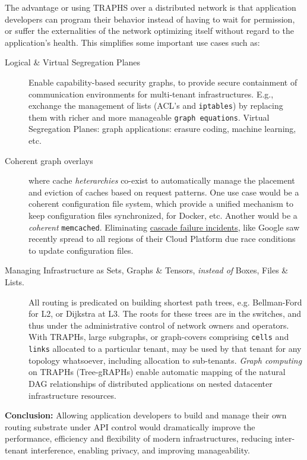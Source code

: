 The advantage or using TRAPHS over a distributed network is that application developers can program their behavior instead of having to wait for permission, or suffer the externalities of the network optimizing itself without regard to the application's health. This simplifies some important use cases such as:
\begin{description}
	\item [Logical \& Virtual Segregation Planes] Enable capability-based security graphs, to provide secure containment of communication environments for multi-tenant infrastructures. E.g., exchange the management of lists (ACL's and \texttt{iptables}) by replacing them with richer and more manageable \texttt{graph equations}. Virtual Segregation Planes: graph applications: erasure coding, machine learning, etc.
	\item [Coherent graph overlays] where cache \emph{heterarchies} co-exist to automatically manage the placement and eviction of caches based on request patterns. One use case would be a coherent configuration file system, which provide a unified mechanism to keep configuration files synchronized, for Docker, etc. Another would be a \emph{coherent} \texttt{memcached}. Eliminating \href{https://status.cloud.google.com/incident/compute/16007?post-mortem}{cascade failure incidents}, like Google saw recently spread to all regions of their Cloud Platform due race conditions to update configuration files. 
	\item [Managing Infrastructure as Sets, Graphs \& Tensors, \emph{instead of} Boxes, Files \& Lists.]  All routing is predicated on building shortest path trees, e.g. Bellman-Ford for L2, or Dijkstra at L3. The roots for these trees are in the switches, and thus under the administrative control of network owners and operators. With TRAPHs, large subgraphs, or graph-covers comprising \texttt{cells} and \texttt{links} allocated to a particular tenant, may be used by that tenant for any topology whatsoever, including allocation to sub-tenants. \emph{Graph computing} on TRAPHs (Tree-gRAPHs) enable automatic mapping of the natural DAG relationships of distributed applications on  nested %
datacenter infrastructure resources.
\end{description}

\begin{highlightbox}
\noindent \textbf{Conclusion:} Allowing application developers to build and manage their own routing substrate under API control would dramatically improve the performance, efficiency and flexibility of modern   infrastructures, reducing inter-tenant interference, enabling privacy, and improving manageability.
\end{highlightbox}


